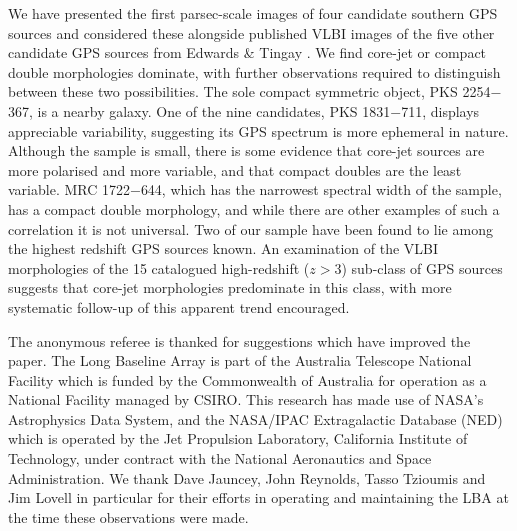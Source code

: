 \documentclass{pasa}%
\begin{document}
We have presented the first parsec-scale images of four candidate
southern GPS
sources and considered these alongside published VLBI images of the
five other candidate GPS sources from Edwards \& Tingay
.  We find core-jet or compact double morphologies
dominate, with further observations required to distinguish between
these two possibilities. The sole compact symmetric object, PKS
2254$-$367, is a nearby galaxy. One of the nine candidates, PKS
1831$-$711, displays appreciable variability, suggesting its GPS
spectrum is more ephemeral in nature. Although the sample is small,
there is some evidence that core-jet sources are more polarised and
more variable, and that compact doubles are the least variable.  MRC
1722$-$644, which has the narrowest spectral width of the sample, has
a compact double morphology, and while there are other examples of
such a correlation it is not universal.  Two of our sample have been
found to lie among the highest redshift GPS sources known.
An examination of the VLBI morphologies of the 15 catalogued
high-redshift ($z>$3) sub-class of GPS sources
suggests that core-jet morphologies predominate in this class,
with more systematic follow-up of this apparent trend encouraged.



\begin{acknowledgements}
The anonymous referee is thanked for suggestions which have
improved the paper.
The Long Baseline Array is part of the Australia Telescope National
Facility which is funded by the Commonwealth of Australia for
operation as a National Facility managed by CSIRO.  This research has
made use of NASA's Astrophysics Data System, and the NASA/IPAC
Extragalactic Database (NED) which is operated by the Jet Propulsion
Laboratory, California Institute of Technology, under contract with
the National Aeronautics and Space Administration.  We thank Dave
Jauncey, John Reynolds, Tasso Tzioumis and Jim Lovell in particular
for their efforts in operating and maintaining the LBA at the time
these observations were made.
\end{acknowledgements}
\end{document}
